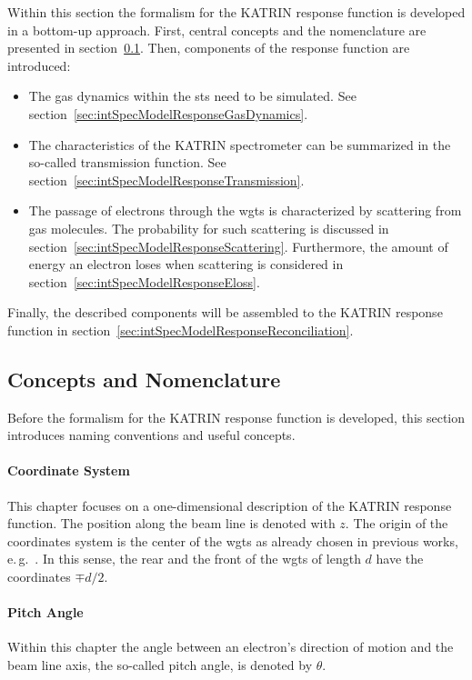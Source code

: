 Within this section the formalism for the KATRIN response function is developed in a bottom-up approach. First, central concepts and the nomenclature are presented in section~\ref{sec:intSpecModelResponseConcepts}. Then, components of the response function are introduced: 
\begin{itemize}
	\item The gas dynamics within the \gls{sts} need to be simulated. See section~\ref{sec:intSpecModelResponseGasDynamics}.
	\item The characteristics of the KATRIN spectrometer can be summarized in the so-called transmission function. See section~\ref{sec:intSpecModelResponseTransmission}.
	\item The passage of electrons through the \gls{wgts} is characterized by scattering from gas molecules. The probability for such scattering is discussed in section~\ref{sec:intSpecModelResponseScattering}. Furthermore, the amount of energy an electron loses when scattering is considered in section~\ref{sec:intSpecModelResponseEloss}.
\end{itemize}
Finally, the described components will be assembled to the KATRIN response function in section~\ref{sec:intSpecModelResponseReconciliation}.
\subsection{Concepts and Nomenclature}
\label{sec:intSpecModelResponseConcepts}
Before the formalism for the KATRIN response function is developed, this section introduces naming conventions and useful concepts. 

\paragraph{Coordinate System}
This chapter focuses on a one-dimensional description of the KATRIN response function. The position along the beam line is denoted with $z$. The origin of the coordinates system is the center of the \gls{wgts} as already chosen in previous works, e.\,g.~\cite{Groh2015,Kleesiek2014}. In this sense, the rear and the front of the \gls{wgts} of length $d$ have the coordinates $\mp d/2$.

\paragraph{Pitch Angle}
Within this chapter the angle between an electron's direction of motion and the beam line axis, the so-called pitch angle, is denoted by $\theta$.

